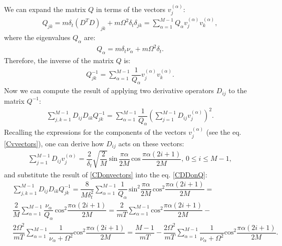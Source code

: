 \documentclass{article}
\begin{document}
We can expand the matrix $Q$ in terms of the vectors $v_{j}^{(\alpha)}$: 
\begin{align}
    Q_{jk} = m\delta_{t}(D^{T}D)_{jk}+m\Omega^{2}\delta_{t}\delta_{jk} = \sum_{\alpha=1}^{M-1} Q_{\alpha} v_{j}^{(\alpha)}v_{k}^{(\alpha)},
\end{align}
where the eigenvalues $Q_{\alpha}$ are:
\begin{align}
    Q_{\alpha} = m\delta_{t}\nu_{\alpha} + m \Omega^{2}\delta_{t}.
\end{align}
Therefore, the inverse of the matrix $Q$ is:
\begin{align}
    Q_{jk}^{-1} = \sum_{\alpha = 1}^{M-1} \dfrac{1}{Q_{\alpha}}v_{j}^{(\alpha)}v_{k}^{(\alpha)}.
\end{align}
Now we can compute the result of applying two derivative operators $D_{ij}$ to the matrix $Q^{-1}$:
\begin{align}\label{CDDonQ}
    \sum_{j,k=1}^{M-1} D_{ij}D_{ik}Q_{jk}^{-1} = \sum_{\alpha=1}^{M-1} \dfrac{1}{Q_{\alpha}} \left(\sum_{j=1}^{M-1}D_{ij}v_{j}^{(\alpha)}\right)^{2}.
\end{align}
Recalling the expressions for the components of the vectors $v_{j}^{(\alpha)}$ (see the eq$.$ \eqref{Cvvectors}), one can derive how $D_{ij}$ acts on these vectors:
\begin{align}\label{CDonvectors}
    \sum_{j=1}^{M-1} D_{ij}v_{j}^{(\alpha)} = \dfrac{2}{\delta_{t}}\sqrt{\dfrac{2}{M}}\,\textrm{sin}\,\dfrac{\pi \alpha}{2M}\,\textrm{cos}\,\dfrac{\pi \alpha(2i+1)}{2M},\, 0 \leq i \leq M-1,
\end{align}
and substitute the result of \eqref{CDonvectors} into the eq$.$ \eqref{CDDonQ}:
\begin{align}\label{Csingular}
     &\sum_{j,k=1}^{M-1} D_{ij}D_{ik}Q_{jk}^{-1} = \dfrac{8}{M\delta_{t}^{2}}\sum_{\alpha=1}^{M-1}\dfrac{1}{Q_{\alpha}}\,\textrm{sin}^{2}\dfrac{\pi \alpha}{2 M}\,\textrm{cos}^{2}\dfrac{\pi \alpha(2i+1)}{2M} =\\
     &\dfrac{2}{M}\sum_{\alpha=1}^{M-1}\dfrac{\nu_{\alpha}}{Q_{\alpha}}\,\textrm{cos}^{2}\dfrac{\pi \alpha(2i+1)}{2M} = \dfrac{2}{mT}\sum_{\alpha=1}^{M-1}\textrm{cos}^{2}\dfrac{\pi \alpha(2i+1)}{2M}-\nonumber\\
     &\dfrac{2\Omega^{2}}{mT}\sum_{\alpha=1}^{M-1}\dfrac{1}{\nu_{\alpha}+\Omega^{2}}\textrm{cos}^{2}\dfrac{\pi \alpha(2i+1)}{2M} = \dfrac{M-1}{mT}-\dfrac{2\Omega^{2}}{mT}\sum_{\alpha=1}^{M-1}\dfrac{1}{\nu_{\alpha}+\Omega^{2}}\textrm{cos}^{2}\dfrac{\pi \alpha(2i+1)}{2M}.
\end{align}
\end{document}
